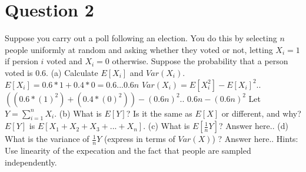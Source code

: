 \documentclass[12pt]{report}
\begin{document}
\section{Question 2}
Suppose you carry out a poll following an election. You do this by selecting $n$ people uniformly at random and asking whether they voted or not, letting $X_i = 1$ if persion $i$ voted and $X_i = 0$ otherwise. Suppose the probability that a person voted is $0.6$.
\newline
\newline
(a) Calculate $E[X_i]$ and $Var(X_i)$.
\newline
$E[X_i] = 0.6 * 1 + 0.4 * 0 = 0.6... 0.6n$
\newline
$Var(X_i) = E[X_i^2] - E[X_i]^2$..
\newline
$((0.6 * (1)^2) + (0.4 * (0)^2)) - (0.6n)^2$..
\newline
$0.6n - (0.6n)^2$
\newline
\newline
Let $Y = \sum\limits_{i=1}^n X_i$.
\newline
(b) What is $E[Y]$? Is it the same as $E[X]$ or different, and why?
\newline
$E[Y]$ is $E[X_1 + X_2 + X_3 + ... + X_n]$.
\newline
\newline
(c) What is $E[\frac{1}{n} Y]$?
\newline
Answer here..
\newline
\newline
(d) What is the variance of $\frac{1}{n} Y$ (express in terms of $Var(X)$) ?
\newline
Answer here..
\newline
\newline
Hints: Use linearity of the expecation and the fact that people are sampled independently.
\end{document}
